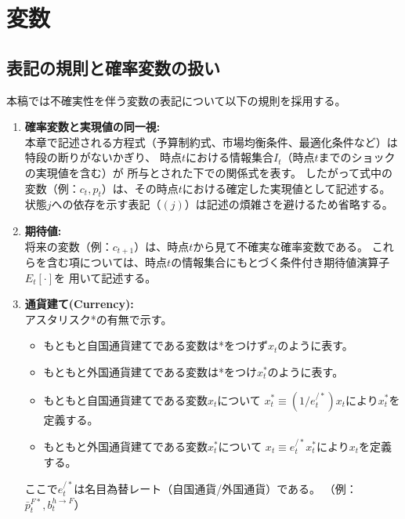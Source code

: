 
\section{変数}
\label{sec:model_variables}

\subsection*{表記の規則と確率変数の扱い}
\label{sec:model_variables_notation}
本稿では不確実性を伴う変数の表記について以下の規則を採用する。
\begin{enumerate}
    \item
        \label{itm:model_variables_notation_realization}
        \textbf{確率変数と実現値の同一視:}\\
        本章で記述される方程式（予算制約式、市場均衡条件、最適化条件など）は特段の断りがないかぎり、
        時点\(t\)における情報集合\(I_t\)（時点\(t\)までのショックの実現値を含む）が
        所与とされた下での関係式を表す。
        したがって式中の変数（例：\(c_t,p_t\)）は、その時点\(t\)における確定した実現値として記述する。
        状態\(j\)への依存を示す表記（\((j)\)）は記述の煩雑さを避けるため省略する。
    \item
        \label{itm:model_variables_notation_expectation}
        \textbf{期待値:}\\
        将来の変数（例：\(c_{t+1}\)）は、時点\(t\)から見て不確実な確率変数である。
        これらを含む項については、時点\(t\)の情報集合にもとづく条件付き期待値演算子\(E_t[\cdot]\)を
        用いて記述する。
    \item
        \label{itm:model_variables_notation_asterisk}
        \textbf{通貨建て(Currency):}\\
        アスタリスク*の有無で示す。
        \begin{itemize}
            \item
                \label{itm:model_variables_notation_asterisk_home}
                もともと自国通貨建てである変数は*をつけず\(x_t\)のように表す。
            \item
                \label{itm:model_variables_notation_asterisk_foreign}
                もともと外国通貨建てである変数は*をつけ\(x_t^*\)のように表す。
            \item
                \label{itm:model_variables_notation_asterisk_def_foreign}
                もともと自国通貨建てである変数\(x_t\)について
                \(x_t^*\equiv(1/e_t^{/*})x_t\)により\(x_t^*\)を定義する。
            \item
                \label{itm:model_variables_notation_asterisk_def_home}
                もともと外国通貨建てである変数\(x_t^*\)について
                \(x_t\equiv e_t^{/*}x_t^*\)により\(x_t\)を定義する。
        \end{itemize}
        ここで\(e_t^{/*}\)は名目為替レート（自国通貨/外国通貨）である。
        （例：\(\bar{p}_t^{F*},b_t^{h\to F}\)）
\end{enumerate}
